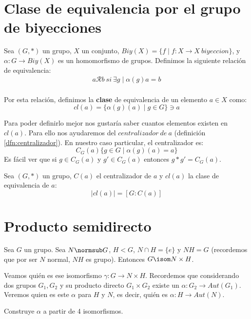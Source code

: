 \section{Clase de equivalencia por el grupo de biyecciones}
\begin{dfn}
Sea $(G, \ast)$ un grupo, $X$ un conjunto, $Biy(X) = \{f\mid f: X\longrightarrow X\ biyeccion\}$, y $\alpha: G \longrightarrow Biy(X)$ es un homomorfismo de grupos. Definimos la siguiente relación de equivalencia:
\begin{align*}
	a\mathcal{R}b\ si\ \exists g \mid \alpha(g)a=b
\end{align*}\\
Por esta relación, definimos la \textbf{clase} de equivalencia de un elemento $a \in X$ como:  \[cl(a)=\{ \alpha(g)(a)\mid g\in G \} \ni a \]
\end{dfn}
Para poder definirlo mejor nos gustaría saber cuantos elementos existen en $cl(a)$. Para ello nos ayudaremos del $centralizador\ de\ a$ (definición \ref{dfn:centralizador}). En nuestro caso particular, el centralizador es:
\[ C_G(a) \{g\in G \mid \alpha(g)(a) = a \} \]
Es fácil ver que si $g \in C_G(a)$ y $g' \in C_G(a)$ entonces $g \ast g' = C_G(a)$.
\begin{thm}
Sea $(G, \ast)$ un grupo, $C(a)$ el centralizador de $a$ y $cl(a)$ la clase de equivalencia de $a$:
\[ |cl(a)| = \left[ G:C(a) \right] \]
\end{thm}
\section{Producto semidirecto}
Sea $G$ un grupo. Sea $N \normsub G$, $H < G$, $N \cap H = \{e\}$ y $NH = G$ (recordemos que por ser $N$ normal, $NH$ es grupo). Entonces $G \isom N \times H$.

Veamos quién es ese isomorfismo $\gamma : G \to N \times H$. Recordemos que considerando dos grupos $G_1, G_2$ y su producto directo $G_1 \times G_2$ existe un $\alpha : G_2 \to Aut(G_1)$. Veremos quien es este $\alpha$ para $H$ y $N$, es decir, quién es $\alpha: H \to Aut(N)$.

Construye $\alpha$ a partir de 4 isomorfismos.

